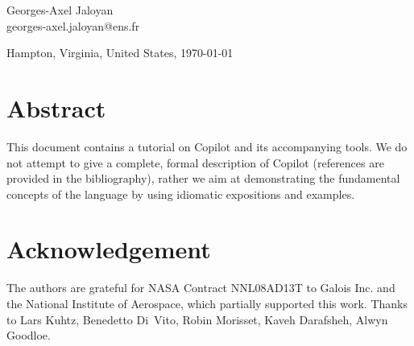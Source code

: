 \documentclass[12pt]{article}
\theoremstyle{example}
\begin{document}
\begin{center}
\begin{minipage}{0.3\textwidth}
\large
\begin{center}
Georges-Axel Jaloyan \\
\small{
georges-axel.jaloyan@ens.fr\\
}
\end{center}
\end{minipage}

\vspace{1cm}

{\large
Hampton, Virginia, United States, \today
}


\let\thefootnote\relax{}

\end{center}

\vspace{0.25cm}

\section*{Abstract}

{
\small
This document contains a tutorial on Copilot and its accompanying tools.
We do not attempt to give a complete, formal description of Copilot
(references are provided in the bibliography), rather we aim at
demonstrating the fundamental concepts of the language by using idiomatic
expositions and examples.
}

{
\small
\setcounter{tocdepth}{2}
\tableofcontents
}

\newpage
{}
\section*{Acknowledgement}

The authors are grateful for NASA Contract NNL08AD13T to Galois Inc. and the
National Institute of Aerospace, which partially supported this work.
Thanks to Lars Kuhtz, Benedetto Di~Vito,  Robin Morisset, Kaveh
Darafsheh, Alwyn Goodloe.

{







}
\end{document}
